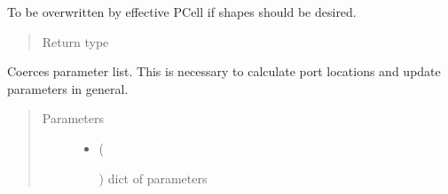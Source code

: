 \documentclass[a4paper,10pt,english]{sphinxmanual}
\begin{document}
\begin{fulllineitems}
\begin{fulllineitems}
\begin{quote}
\begin{description}
\begin{itemize}
\end{itemize}

\end{description}\end{quote}

\end{fulllineitems}


\begin{fulllineitems}
\label{\detokenize{photonics/photonics:kppc.photonics.PhotDevice.shapes}}
To be overwritten by effective PCell if shapes should be desired.
\begin{quote}\begin{description}
\item[{Return type}] \leavevmode
{}%
\begin{footnote}[73]\sphinxAtStartFootnote
{}
%
\end{footnote}

\end{description}\end{quote}

\end{fulllineitems}


\begin{fulllineitems}
\label{\detokenize{photonics/photonics:kppc.photonics.PhotDevice.update_parameter_list}}
Coerces parameter list. This is necessary to calculate port locations and update parameters in general.
\begin{quote}\begin{description}
\item[{Parameters}] \leavevmode\begin{itemize}
\item {} 
 (%
\begin{footnote}[74]\sphinxAtStartFootnote
{}
%
\end{footnote}) \textendash{} dict of parameters


\end{itemize}
\end{description}
\end{quote}
\end{fulllineitems}
\end{fulllineitems}
\end{document}
